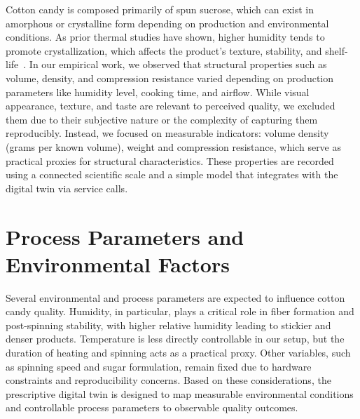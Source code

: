 Cotton candy is composed primarily of spun sucrose, which can exist in amorphous or crystalline form depending on production and environmental conditions. As prior thermal studies have shown, higher humidity tends to promote crystallization, which affects the product's texture, stability, and shelf-life~\cite{TERASHIMA2022139953}. In our empirical work, we observed that structural properties such as volume, density, and compression resistance varied depending on production parameters like humidity level, cooking time, and airflow. While visual appearance, texture, and taste are relevant to perceived quality, we excluded them due to their subjective nature or the complexity of capturing them reproducibly. Instead, we focused on measurable indicators: volume density (grams per known volume), weight and compression resistance, which serve as practical proxies for structural characteristics. These properties are recorded using a connected scientific scale and a simple model that integrates with the digital twin via service calls.


\section{Process Parameters and Environmental Factors}




Several environmental and process parameters are expected to influence cotton candy quality. Humidity, in particular, plays a critical role in fiber formation and post-spinning stability, with higher relative humidity leading to stickier and denser products. Temperature is less directly controllable in our setup, but the duration of heating and spinning acts as a practical proxy. Other variables, such as spinning speed and sugar formulation, remain fixed due to hardware constraints and reproducibility concerns. Based on these considerations, the prescriptive digital twin is designed to map measurable environmental conditions and controllable process parameters to observable quality outcomes.

